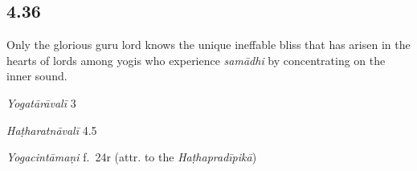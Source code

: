 \begin{ekdosis}
\subsection*{4.36}
\begin{translation}[hp04_036]
Only the glorious guru lord knows the unique ineffable bliss that has arisen in the hearts of lords among yogis who experience \textit{samādhi} by concentrating on the inner sound.
\end{translation}


\begin{sources}[hp04_036]
\emph{Yogatārāvalī} 3
\begin{versinnote}
\tl{\var{ekaḥ ] Pa : eva Ad}\\!}
\end{versinnote}
\end{sources}

\begin{testimonia}[hp04_036]
\emph{Haṭharatnāvalī} 4.5
\begin{versinnote}
\end{versinnote}

\emph{Yogacintāmaṇi} f.~24r (attr. to the \emph{Haṭhapradīpikā})
\begin{versinnote}
\end{versinnote}

\end{testimonia}



\end{ekdosis}
